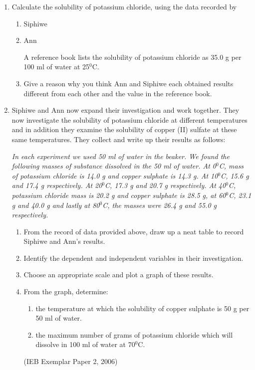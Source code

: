 {	\begin{enumerate}
	\item{Calculate the solubility of potassium chloride, using the data recorded by}
		\begin{enumerate}
		\item{Siphiwe}
		\item{Ann}
		

A reference book lists the solubility of potassium chloride as 35.0 g per 100 ml of water at 25$^{0}$C.
		\item{Give a reason why you think Ann and Siphiwe each obtained results different from each other and the value in the reference book.}
		\end{enumerate}

\item{Siphiwe and Ann now expand their investigation and work together. They now investigate the solubility of potassium chloride at different temperatures and in addition they examine the solubility of copper (II) sulfate at these same temperatures. They collect and write up their results as follows:}

\textit{In each experiment we used 50 ml of water in the beaker. We found the following masses of substance dissolved  in the 50 ml of water. At 0$^{0}$C, mass of potassium chloride is 14.0 g and copper sulphate is 14.3 g. At 10$^{0}$C, 15.6 g and 17.4 g respectively. At 20$^{0}$C, 17.3 g and 20.7 g respectively. At 40$^{0}$C, potassium chloride mass is 20.2 g and copper sulphate is 28.5 g, at 60$^{0}$C, 23.1 g and 40.0 g and lastly at 80$^{0}$C, the masses were 26.4 g and 55.0 g respectively.}

	\begin{enumerate}
	\item{From the record of data provided above, draw up a neat table to record Siphiwe and Ann's results.}
	\item{Identify the dependent and independent variables in their investigation.}
	\item{Choose an appropriate scale and plot a graph of these results.}
	\item{From the graph, determine:}
		\begin{enumerate}
		\item{the temperature at which the solubility of copper sulphate is 50 g per 50 ml of water.}
		\item{the maximum number of grams of potassium chloride which will dissolve in 100 ml of water at 70$^{0}$C.}
		\end{enumerate}
(IEB Exemplar Paper 2, 2006)
	\end{enumerate}
	\end{enumerate}
}


